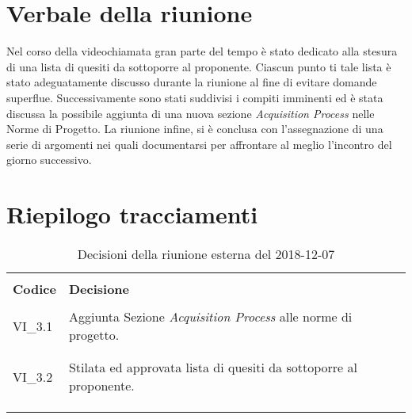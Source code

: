\section{Verbale della riunione}
Nel corso della videochiamata gran parte del tempo è stato dedicato alla 
stesura di una lista di quesiti da sottoporre al proponente. Ciascun 
punto ti tale lista è stato adeguatamente discusso durante la riunione al fine 
di evitare domande superflue. 
\newline \newline
Successivamente sono stati suddivisi i compiti imminenti ed è stata discussa la 
possibile aggiunta di una nuova sezione \textit{Acquisition Process} nelle 
Norme di Progetto.
\newline \newline
La riunione infine, si è conclusa con l'assegnazione di una serie di argomenti 
nei quali documentarsi per affrontare al meglio l'incontro del giorno 
successivo.

\section{Riepilogo tracciamenti}
\begin{centering}
\begin{longtable}{ >{\centering}p{4cm} >{\centering}p{11cm} }

\hline
\\[0.5pt]
	\textbf{Codice} & \textbf{Decisione} 
	
	\tabularnewline 
	\hline
	
	
				\\[0.5pt]
				VI\_3.1 & Aggiunta Sezione \textit{Acquisition Process} alle 
				norme di progetto.
				\\[0.5pt]
				\tabularnewline
				\hline
				\\[0.5pt]
				VI\_3.2 & Stilata ed approvata lista di quesiti da sottoporre 
				al proponente.
				\\[0.5pt]
				\tabularnewline
				\hline
						

        \\[0.7pt]
        \caption{Decisioni della riunione esterna del 2018-12-07}
\end{longtable}
\end{centering}

